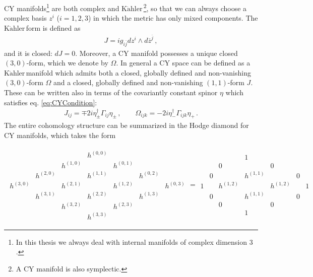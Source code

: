 \documentclass[12pt,a4paper]{book}
\newcommand{\Kahler}{\ensuremath{\text{K}\ddot{\text{a}}\text{hler}\,}}
\begin{document}
CY manifolds\footnote{In this thesis we always deal with internal manifolds of complex dimension $3$.} are both complex and \Kahler\footnote{A CY manifold is also symplectic.}, so that we can always choose a complex basis $z^i$ ($i = 1,2,3$) in which the metric has only mixed components. The \Kahler form is defined as
\begin{align}
\label{eq:KahlerForm}
J = i g_{i \overline{j}} dz^i \wedge d\overline{z}^{\overline{j}} \,,
\end{align}
and it is closed: $dJ = 0$. Moreover, a CY manifold possesses a unique closed $(3,0)$-form, which we denote by $\Omega$. In general a CY space can be defined as a \Kahler manifold which admits both a closed, globally defined and non-vanishing $(3,0)$-form $\Omega$ and a closed, globally defined and non-vanishing $(1,1)$-form $J$. These can be written also in terms of the covariantly constant spinor $\eta$ which satisfies eq. \eqref{eq:CYCondition}:
\begin{align}
\label{eq:JandOmegaEta}
J_{ij} = \mp 2i \eta^\dagger_\pm \Gamma_{ij} \eta_\pm\,, \qquad \Omega_{ijk} = -2i \eta^\dagger_- \Gamma_{ijk} \eta_+\,.
\end{align}
The entire cohomology structure can be summarized in the Hodge diamond for CY manifolds, which takes the form
\begin{small}
\begin{align}
\begin{array}{ccccccc}
&  &  & h^{(0,0)} &  &  &  \\
&  & h^{(1,0)} &  & h^{(0,1)} &  &  \\
& h^{(2,0)} &  & h^{(1,1)} &  & h^{(0,2)} &  \\
h^{(3,0)} &  & h^{(2,1)} &  & h^{(1,2)} &  & h^{(0,3)} \\
& h^{(3,1)} &  & h^{(2,2)} &  & h^{(1,3)} &  \\
&  & h^{(3,2)} &  & h^{(2,3)} &  &  \\
&  &  & h^{(3,3)} &  &  &
\end{array}
=
\begin{array}{ccccccc}
&  &  & 1 &  &  &  \\
&  & 0 &  & 0 &  &  \\
& 0 &  & h^{(1,1)} &  & 0 &  \\
1 &  & h^{(1,2)} &  & h^{(1,2)} &  & 1 \\
& 0 &  & h^{(1,1)} &  & 0 &  \\
&  & 0 &  & 0 &  &  \\
&  &  & 1 &  &  &
\end{array}
\label{eq:HodgeDiamond}
\end{align}
\end{small}
\end{document}
